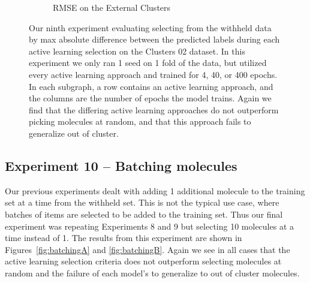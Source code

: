 \documentclass[journal=jmcmar,manuscript=article]{achemso}
\begin{document}
\begin{figure}[tbph]
\begin{subfigure}[b]{0.48\textwidth}
        \caption{RMSE on the External Clusters}
    \end{subfigure}
    \caption{Our ninth experiment evaluating selecting from the withheld data by max absolute difference between the predicted labels during each active learning selection on the Clusters 02 dataset. In this experiment we only ran 1 seed on 1 fold of the data, but utilized every active learning approach and trained for 4, 40, or 400 epochs. In each subgraph, a row contains an active learning approach, and the columns are the number of epochs the model trains. Again we find that the differing active learning approaches do not outperform picking molecules at random, and that this approach fails to generalize out of cluster.}
    \label{fig:bylabel}
\end{figure}

\subsection{Experiment 10 -- Batching molecules}

Our previous experiments dealt with adding 1 additional molecule to the training set at a time from the withheld set. This is not the typical use case, where batches of items are selected to be added to the training set. Thus our final experiment was repeating Experiments 8 and 9 but selecting 10 molecules at a time instead of 1. The results from this experiment are shown in Figures~\ref{fig:batchingA} and \ref{fig:batchingB}. Again we see in all cases that the active learning selection criteria does not outperform selecting molecules at random and the failure of each model's to generalize to out of cluster molecules. 
\end{document}
